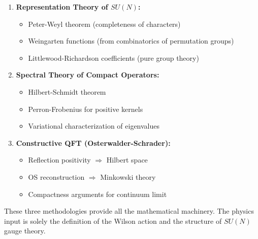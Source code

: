 \begin{enumerate}
\item \textbf{Representation Theory of $SU(N)$:}
\begin{itemize}
\item Peter-Weyl theorem (completeness of characters)
\item Weingarten functions (from combinatorics of permutation groups)
\item Littlewood-Richardson coefficients (pure group theory)
\end{itemize}

\item \textbf{Spectral Theory of Compact Operators:}
\begin{itemize}
\item Hilbert-Schmidt theorem
\item Perron-Frobenius for positive kernels
\item Variational characterization of eigenvalues
\end{itemize}

\item \textbf{Constructive QFT (Osterwalder-Schrader):}
\begin{itemize}
\item Reflection positivity $\Rightarrow$ Hilbert space
\item OS reconstruction $\Rightarrow$ Minkowski theory
\item Compactness arguments for continuum limit
\end{itemize}
\end{enumerate}

These three methodologies provide all the mathematical machinery. The physics 
input is solely the definition of the Wilson action and the structure of 
$SU(N)$ gauge theory.






